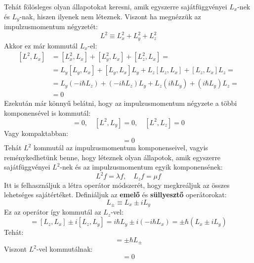 \documentclass[../main.tex]{subfiles}
\begin{document}
Tehát fölösleges olyan állapotokat keresni, amik egyszerre sajátfüggvényei $L_x$-nek és $L_y$-nak, hiszen ilyenek nem léteznek. Viszont ha megnézzük az impulzusmomentum négyzetét:
\begin{equation}
    L^2 \equiv L_x^2 + L_y^2 + L_z^2
\end{equation}
Akkor ez már kommutál $L_x$-el:
\begin{equation}
    \begin{aligned}
        [L^2, L_x] &= [L^2_x, L_x] + [L^2_y, L_x] + [L^2_z, L_x] = \\
        &= L_y [L_y, L_x] + [L_y, L_x] L_y + L_z [L_z, L_x] + [L_z, L_x] L_z = \\
        &= L_y (- i \hbar L_z) + (- i \hbar L_z) L_y + L_z (i \hbar L_y) + (i \hbar L_y) L_z = \\
        &= 0
    \end{aligned}
\end{equation}
Ezekután már könnyű belátni, hogy az impulzusmomentum négyzete a többi komponensével is kommutál:
\begin{equation}
    [L^2, L_x] = 0, \quad [L^2, L_y] = 0, \quad [L^2, L_z] = 0
\end{equation}
Vagy kompaktabban:
\begin{equation}
    [L^2, \mathbf{L}] = 0
\end{equation}
Tehát $L^2$ kommutál az impulzusmomentum komponenseivel, vagyis reménykedhetünk benne, hogy léteznek olyan állapotok, amik egyszerre sajátfüggvényei $L^2$-nek és az impulzusmomentum egyik komponensének:
\begin{equation}
    L^2 f = \lambda f, \quad L_z f = \mu f
\end{equation}
Itt is felhasználjuk a létra operátor módszerét, hogy megkreáljuk az összes lehetséges sajátértéket. Definiáljuk az \textbf{emelő} és \textbf{süllyesztő} operátorokat:
\begin{equation}
    L_\pm \equiv L_x \pm i L_y
\end{equation}
Ez az operátor így kommutál az $L_z$-vel:
\begin{equation}
    [L_z, L_\pm] = [L_z, L_x] \pm i [L_z, L_y] = i \hbar L_y \pm i (-i \hbar L_x) = \pm \hbar (L_x \pm i L_y)
\end{equation}
Tehát:
\begin{equation}
    [L_z, L_\pm] = \pm \hbar L_\pm
\end{equation}
Viszont $L^2$-vel kommutálnak:
\begin{equation}
    [L^2, L_\pm] = 0
\end{equation}
\end{document}

